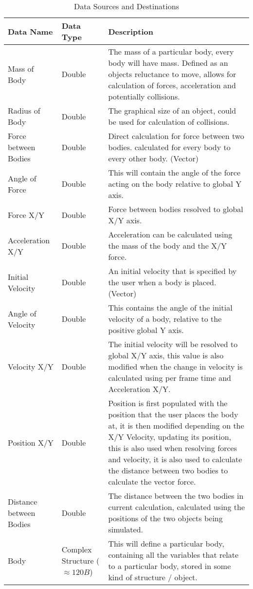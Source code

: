 \begin{table}[htbp]
\caption{Data Sources and Destinations}
\centering
\footnotesize
\def\arraystretch{1.5}
\begin{tabular}{|M{3cm}|M{3cm}|m{8cm}|}
\hline 
\textbf{Data Name} & \textbf{Data Type} & \textbf{Description} \\
\hline
Mass of Body & Double & The mass of a particular body, every body will have mass. Defined as an objects reluctance to move, allows for calculation of forces, acceleration and potentially collisions. \\
\hline
Radius of Body & Double & The graphical size of an object, could be used for calculation of collisions. \\
\hline
Force between Bodies & Double & Direct calculation for force between two bodies. calculated for every body to every other body. (Vector) \\
\hline
Angle of Force & Double & This will contain the angle of the force acting on the body relative to global Y axis. \\
\hline
Force X/Y & Double & Force between bodies resolved to global X/Y axis. \\
\hline
Acceleration X/Y & Double & Acceleration can be calculated using the mass of the body and the X/Y force. \\
\hline
Initial Velocity & Double & An initial velocity that is specified by the user when a body is placed. (Vector) \\
\hline
Angle of Velocity & Double & This contains the angle of the initial velocity of a body, relative to the positive global Y axis. \\
\hline
Velocity X/Y & Double & The initial velocity will be resolved to global X/Y axis, this value is also modified when the change in velocity is calculated using per frame time and Acceleration X/Y. \\
\hline
Position X/Y & Double & Position is first populated with the position that the user places the body at, it is then modified depending on the X/Y Velocity, updating its position, this is also used when resolving forces and velocity, it is also used to calculate the distance between two bodies to calculate the vector force. \\
\hline
Distance between Bodies & Double & The distance between the two bodies in current calculation, calculated using the positions of the two objects being simulated. \\
\hline
Body & Complex Structure ($\approx 120B$) & This will define a particular body, containing all the variables that relate to a particular body, stored in some kind of structure / object. \\

\end{tabular}
\end{table}
